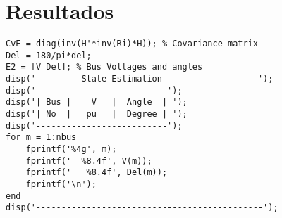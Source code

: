 \section{Resultados}
\begin{verbatim}
CvE = diag(inv(H'*inv(Ri)*H)); % Covariance matrix
Del = 180/pi*del;
E2 = [V Del]; % Bus Voltages and angles
disp('-------- State Estimation ------------------');
disp('--------------------------');
disp('| Bus |    V   |  Angle  | ');
disp('| No  |   pu   |  Degree | ');
disp('--------------------------');
for m = 1:nbus
    fprintf('%4g', m); 
    fprintf('  %8.4f', V(m)); 
    fprintf('   %8.4f', Del(m)); 
    fprintf('\n');
end
disp('---------------------------------------------');

\end{verbatim}


